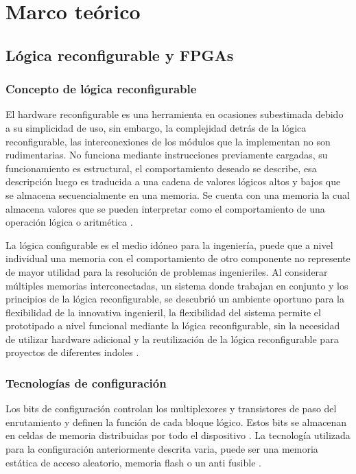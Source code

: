 \chapter{Marco teórico}
\label{ch:marco}

 
\section{Lógica reconfigurable y FPGAs}
\subsection{Concepto de lógica reconfigurable}
El hardware reconfigurable es una herramienta en ocasiones subestimada debido a su simplicidad de uso, sin embargo, la complejidad detrás de la lógica reconfigurable, las interconexiones de los módulos que la implementan no son rudimentarias. No funciona mediante instrucciones previamente cargadas, su funcionamiento es estructural, el comportamiento deseado se describe, esa descripción luego es traducida a una cadena de valores lógicos altos y bajos que se almacena secuencialmente en una memoria. Se cuenta con una memoria la cual almacena valores que se pueden interpretar como el comportamiento de una operación lógica o aritmética \cite{A_oliver2007}.

La lógica configurable es el medio idóneo para la ingeniería, puede que a nivel individual una memoria con el comportamiento de otro componente no represente de mayor utilidad para la resolución de problemas ingenieriles. Al considerar múltiples memorias interconectadas, un sistema donde trabajan en conjunto y los principios de la lógica reconfigurable, se descubrió un ambiente oportuno para la flexibilidad de la innovativa ingenieril, la flexibilidad del sistema permite el prototipado a nivel funcional mediante la lógica reconfigurable, sin la necesidad de utilizar hardware adicional y la reutilización de la lógica reconfigurable para proyectos de diferentes indoles \cite{A_oliver2007}.

\subsection{Tecnologías de configuración}
Los bits de configuración controlan los multiplexores y transistores de paso del enrutamiento y definen la función de cada bloque lógico. Estos bits se almacenan en celdas de memoria distribuidas por todo el dispositivo \cite{kuon2008fpga}. La tecnología utilizada para la configuración anteriormente descrita varia, puede ser una memoria estática de acceso aleatorio, memoria flash o un anti fusible \cite{B_gaillardon2011}. 


